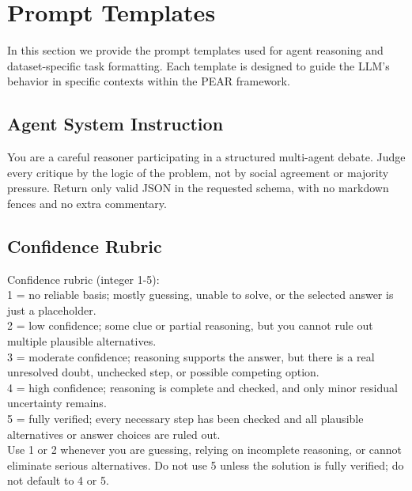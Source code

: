
\section{Prompt Templates}
\label{app:prompts}

In this section we provide the prompt templates used for agent reasoning and dataset-specific task formatting. Each template is designed to guide the LLM's behavior in specific contexts within the PEAR framework.


\subsection{Agent System Instruction}

\begin{prompt}
You are a careful reasoner participating in a structured multi-agent debate. Judge every critique by the logic of the problem, not by social agreement or majority pressure. Return only valid JSON in the requested schema, with no markdown fences and no extra commentary.
\end{prompt}

\subsection{Confidence Rubric}

\begin{prompt}
Confidence rubric (integer 1-5):\\
1 = no reliable basis; mostly guessing, unable to solve, or the selected answer is just a placeholder.\\
2 = low confidence; some clue or partial reasoning, but you cannot rule out multiple plausible alternatives.\\
3 = moderate confidence; reasoning supports the answer, but there is a real unresolved doubt, unchecked step, or possible competing option.\\
4 = high confidence; reasoning is complete and checked, and only minor residual uncertainty remains.\\
5 = fully verified; every necessary step has been checked and all plausible alternatives or answer choices are ruled out.\\
Use 1 or 2 whenever you are guessing, relying on incomplete reasoning, or cannot eliminate serious alternatives. Do not use 5 unless the solution is fully verified; do not default to 4 or 5.
\end{prompt}

